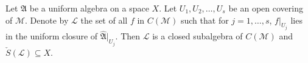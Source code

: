 
Let $\mathfrak{A}$ be a uniform algebra on a space $X$. Let $U_1, U_2, \ldots, U_s$ be an open covering of $\mathcal{M}$. Denote by $\mathcal{L}$ the set of all $f$ in $C(\mathcal{M})$ such that for $j = 1, \ldots, s$, $f|_{U_j}$ lies in the uniform closure of $\hat{\mathfrak{A}}|_{U_j}$. Then $\mathcal{L}$ is a closed subalgebra of $C(\mathcal{M})$ and $\check{S}(\mathcal{L}) \subseteq X$.
